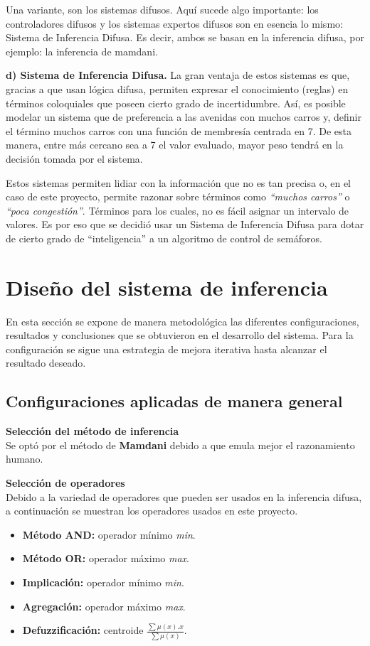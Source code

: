 Una variante, son los sistemas difusos. Aquí sucede algo importante: los controladores difusos y los sistemas expertos difusos son en esencia lo mismo: Sistema de Inferencia Difusa. Es decir, ambos se basan en la inferencia difusa, por ejemplo: la inferencia de mamdani.

\textbf{d) Sistema de Inferencia Difusa.} La gran ventaja de estos sistemas es que, gracias a que usan lógica difusa, permiten expresar el conocimiento (reglas) en términos coloquiales que poseen cierto grado de incertidumbre. Así, es posible modelar un sistema que de preferencia a las avenidas con muchos carros y, definir el término muchos carros con una función de membresía centrada en 7. De esta manera, entre más cercano sea a 7 el valor evaluado, mayor peso tendrá en la decisión tomada por el sistema.

Estos sistemas permiten lidiar con la información que no es tan precisa o, en el caso de este proyecto, permite razonar sobre términos como \textit{``muchos carros''} o \textit{``poca congestión''}. Términos para los cuales, no es fácil asignar un intervalo de valores. Es por eso que se decidió usar un Sistema de Inferencia Difusa para dotar de cierto grado de ``inteligencia'' a un algoritmo de control de semáforos.

\section{Diseño del sistema de inferencia}\label{section:desarrolloFIS}
En esta sección se expone de manera metodológica las diferentes configuraciones, resultados y conclusiones que se obtuvieron en el desarrollo del sistema. Para la configuración se sigue una estrategia de mejora iterativa hasta alcanzar el resultado deseado.

\subsection{Configuraciones aplicadas de manera general}
\textbf{Selección del método de inferencia}\\
Se optó por el método de \textbf{Mamdani} debido a que emula mejor el razonamiento humano.

\textbf{Selección de operadores}\\ 
Debido a la variedad de operadores que pueden ser usados en la inferencia difusa, a continuación se muestran los operadores usados en este proyecto.

\begin{multicols}{2}
\begin{itemize}
	\item \textbf{Método AND:} operador mínimo \emph{min}.
	\item \textbf{Método OR:} operador máximo \emph{max}.
	\item \textbf{Implicación:} operador mínimo \emph{min}.
	\item \textbf{Agregación:} operador máximo \emph{max}.
	\item \textbf{Defuzzificación:} centroide \emph{$\frac{\sum \mu(x).x}{\sum \mu(x)}$}.
\end{itemize}
\end{multicols}
\newpage

